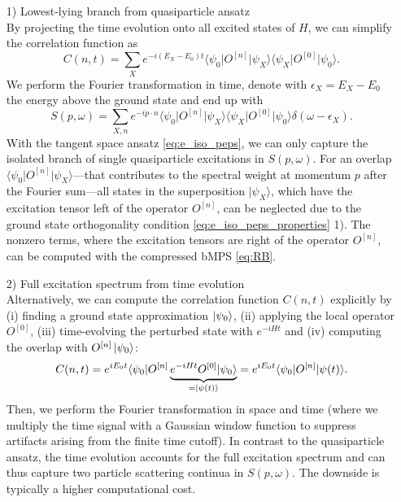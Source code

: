 \begin{enumerate}
	\item[1)] Lowest-lying branch from quasiparticle ansatz \\[0.5em]
	By projecting the time evolution onto all excited states of $H$, we can simplify the correlation function as
	\begin{equation}
		C(n, t) = \sum_X e^{-i(E_X - E_0)t} \langle \psi_0 \vert O^{[n]} \vert \psi_X \rangle \langle \psi_X \vert O^{[0]} \vert \psi_0 \rangle.
	\end{equation}
	We perform the Fourier transformation in time, denote with $\epsilon_X = E_X - E_0$ the energy above the ground state and end up with
	\begin{equation}
		S(p, \omega) = \sum_{X, n} e^{-ip \cdot n} \langle \psi_0 \vert O^{[n]} \vert \psi_X \rangle \langle \psi_X \vert O^{[0]} \vert \psi_0 \rangle \delta(\omega - \epsilon_X).
	\end{equation}
	With the tangent space ansatz \eqref{eq:e_iso_peps}, we can only capture the isolated branch of single quasiparticle excitations in $S(p, \omega)$. For an overlap $\langle \psi_0 \vert O^{[n]} \vert \psi_X \rangle$---that contributes to the spectral weight at momentum $p$ after the Fourier sum---all states in the superposition $\vert \psi_X \rangle$, which have the excitation tensor left of the operator $O^{[n]}$, can be neglected due to the ground state orthogonality condition \eqref{eq:e_iso_peps_properties} 1). The nonzero terms, where the excitation tensors are right of the operator $O^{[n]}$, can be computed with the compressed bMPS \eqref{eq:RB}.
	\item[2)] Full excitation spectrum from time evolution \\[0.5em]
	Alternatively, we can compute the correlation function $C(n, t)$ explicitly by (i) finding a ground state approximation $\ket{\psi_0}$, (ii) applying the local operator $O^{[0]}$, (iii) time-evolving the perturbed state with $e^{-iHt}$ and (iv) computing the overlap with $O^{[n]}\ket{\psi_0}$:
	\begin{equation}
		C(n, t) = e^{iE_0t} \langle \psi_0 \vert O^{[n]} \underbrace{e^{-iHt} O^{[0]} \vert \psi_0 \rangle}_{= \ket{\psi(t)}} 
		= e^{iE_0t} \langle \psi_0 \vert O^{[n]} \vert \psi(t) \rangle.
	\end{equation}
	Then, we perform the Fourier transformation in space and time (where we multiply the time signal with a Gaussian window function to suppress artifacts arising from the finite time cutoff). In contrast to the quasiparticle ansatz, the time evolution accounts for the full excitation spectrum and can thus capture two particle scattering continua in $S(p, \omega)$. The downside is typically a higher computational cost.
\end{enumerate}
